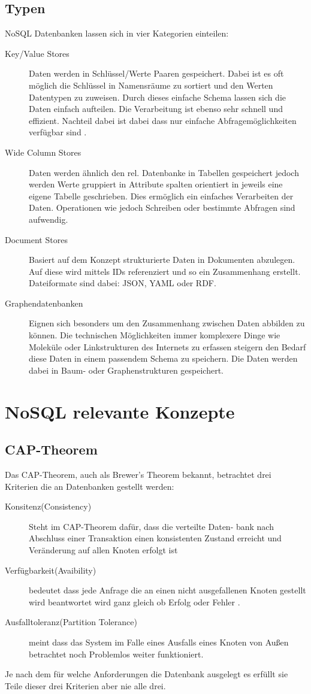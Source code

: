 \documentclass[a4paper,11pt,oneside,%
headsepline,												%
footsepline,												%
bibtotocnumbered									%
]{scrreprt}
\begin{document}
\subsection{Typen}
NoSQL Datenbanken lassen sich in vier Kategorien einteilen:
\begin{description}
   \item[Key/Value Stores] Daten werden in Schlüssel/Werte Paaren gespeichert. Dabei ist es oft möglich die Schlüssel in Namensräume zu sortiert und den Werten Datentypen zu zuweisen. Durch dieses einfache Schema lassen sich die Daten einfach aufteilen. Die Verarbeitung ist ebenso sehr schnell und effizient. Nachteil dabei ist dabei dass nur einfache Abfragemöglichkeiten verfügbar sind \autocite[131]{Edlich2010}. 
   \item[Wide Column Stores] Daten werden ähnlich den rel. Datenbanke in Tabellen gespeichert jedoch werden Werte gruppiert in Attribute spalten orientiert in jeweils eine eigene Tabelle geschrieben. Dies ermöglich ein einfaches Verarbeiten der Daten. Operationen wie jedoch Schreiben oder bestimmte Abfragen sind aufwendig.
   \item[Document Stores] Basiert auf dem Konzept strukturierte Daten in Dokumenten abzulegen. Auf diese wird mittels IDs referenziert und so ein Zusammenhang erstellt. Dateiformate sind dabei: JSON, YAML oder RDF.
   \item[Graphendatenbanken] Eignen sich besonders um den Zusammenhang zwischen Daten abbilden zu können. Die technischen Möglichkeiten immer komplexere Dinge wie Moleküle oder Linkstrukturen des  Internets zu erfassen steigern den Bedarf diese Daten in einem passendem Schema zu speichern. Die Daten werden dabei in Baum- oder Graphenstrukturen gespeichert.
\end{description}

\section{NoSQL relevante Konzepte}
\subsection{CAP-Theorem}
Das CAP-Theorem, auch als Brewer's Theorem bekannt, betrachtet drei Kriterien die an Datenbanken gestellt werden:
\begin{description}
\item[Konsitenz(Consistency)] Steht im CAP-Theorem dafür, dass die verteilte Daten-
bank nach Abschluss einer Transaktion einen konsistenten Zustand erreicht \autocite[31]{Edlich2010} und Veränderung auf allen Knoten erfolgt ist
\item[Verfügbarkeit(Avaibility)] bedeutet dass jede Anfrage die an einen nicht ausgefallenen Knoten gestellt wird beantwortet wird ganz gleich ob Erfolg oder Fehler \autocite[54]{Fowler2013}.
\item[Ausfalltoleranz(Partition Tolerance)] meint dass das System im Falle eines Ausfalls eines Knoten von Außen betrachtet noch Problemlos weiter funktioniert.
\end{description}
Je nach dem für welche Anforderungen die Datenbank ausgelegt es erfüllt sie Teile dieser drei Kriterien aber nie alle drei. 
\end{document}
